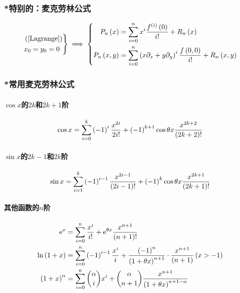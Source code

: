 \documentclass{article}
\begin{document}
\subsubsection{*特别的：麦克劳林公式}

\[\left.\begin{aligned}
         & \left(\ref{Lagrange}\right) \\
         & x_0=y_0=0
    \end{aligned}\right\}
    \implies
    \left\{\begin{aligned}
        P_n\left(x\right)   & =\sum_{i=0}^nx^i\frac{f^{\left(i\right)}\left(0\right)}{i!}+R_n\left(x\right)                       \\
        P_n\left(x,y\right) & =\sum_{i=0}^n\left(x\partial_x+y\partial_y\right)^i\frac{f\left(0,0\right)}{i!}+R_n\left(x,y\right)
    \end{aligned}\right.\]

\subsubsection{*常用麦克劳林公式}

\paragraph{$\cos x$的$2k$和$2k+1$阶}

\[\cos x=\sum_{i=0}^k\left(-1\right)^i\frac{x^{2i}}{2i!}+\left(-1\right)^{k+1}\cos\theta x\frac{x^{2k+2}}{\left(2k+2\right)!}\]

\paragraph{$\sin x$的$2k-1$和$2k$阶}

\[\sin x=\sum_{i=1}^k\left(-1\right)^{i-1}\frac{x^{2i-1}}{\left(2i-1\right)!}+\left(-1\right)^k\cos\theta x\frac{x^{2k+1}}{\left(2k+1\right)!}\]

\paragraph{其他函数的$n$阶}

\[\begin{aligned}
        \mathrm e^x           & =\sum_{i=0}^n\frac{x^i}{i!}+\mathrm e^{\theta x}\frac{x^{n+1}}{\left(n+1\right)!}                                                \\
        \ln\left(1+x\right)     & =\sum_{i=0}^n\left(-1\right)^{i-1}\frac{x^i}{i}+\frac{\left(-1\right)^n}{\left(1+\theta x\right)^{n+1}}\cdot\frac{x^{n+1}}{\left(n+1\right)}\left(x>-1\right) \\
        \left(1+x\right)^\alpha & =\sum_{i=0}^n\binom \alpha ix^i+\binom \alpha{n+1}\frac{x^{n+1}}{\left(1+\theta x\right)^{n+1-\alpha}}
    \end{aligned}\]
\end{document}
